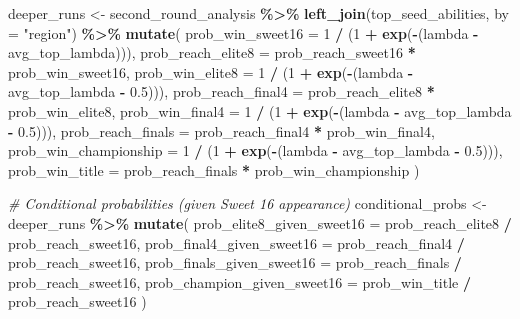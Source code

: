 \documentclass[
]{article}
\newenvironment{Shaded}{\begin{snugshade}}{\end{snugshade}}
\newcommand{\AttributeTok}[1]{\textcolor[rgb]{0.13,0.29,0.53}{#1}}
\newcommand{\CommentTok}[1]{\textcolor[rgb]{0.56,0.35,0.01}{\textit{#1}}}
\newcommand{\DecValTok}[1]{\textcolor[rgb]{0.00,0.00,0.81}{#1}}
\newcommand{\FloatTok}[1]{\textcolor[rgb]{0.00,0.00,0.81}{#1}}
\newcommand{\FunctionTok}[1]{\textcolor[rgb]{0.13,0.29,0.53}{\textbf{#1}}}
\newcommand{\NormalTok}[1]{#1}
\newcommand{\OtherTok}[1]{\textcolor[rgb]{0.56,0.35,0.01}{#1}}
\newcommand{\SpecialCharTok}[1]{\textcolor[rgb]{0.81,0.36,0.00}{\textbf{#1}}}
\newcommand{\StringTok}[1]{\textcolor[rgb]{0.31,0.60,0.02}{#1}}
\begin{document}
\begin{Shaded}
\begin{Highlighting}[]
\NormalTok{deeper\_runs }\OtherTok{\textless{}{-}}\NormalTok{ second\_round\_analysis }\SpecialCharTok{\%\textgreater{}\%}
    \FunctionTok{left\_join}\NormalTok{(top\_seed\_abilities, }\AttributeTok{by =} \StringTok{"region"}\NormalTok{) }\SpecialCharTok{\%\textgreater{}\%}
    \FunctionTok{mutate}\NormalTok{(}
        \AttributeTok{prob\_win\_sweet16 =} \DecValTok{1} \SpecialCharTok{/}\NormalTok{ (}\DecValTok{1} \SpecialCharTok{+} \FunctionTok{exp}\NormalTok{(}\SpecialCharTok{{-}}\NormalTok{(lambda }\SpecialCharTok{{-}}\NormalTok{ avg\_top\_lambda))),}
        \AttributeTok{prob\_reach\_elite8 =}\NormalTok{ prob\_reach\_sweet16 }\SpecialCharTok{*}\NormalTok{ prob\_win\_sweet16,}
        \AttributeTok{prob\_win\_elite8 =} \DecValTok{1} \SpecialCharTok{/}\NormalTok{ (}\DecValTok{1} \SpecialCharTok{+} \FunctionTok{exp}\NormalTok{(}\SpecialCharTok{{-}}\NormalTok{(lambda }\SpecialCharTok{{-}}\NormalTok{ avg\_top\_lambda }\SpecialCharTok{{-}} \FloatTok{0.5}\NormalTok{))),}
        \AttributeTok{prob\_reach\_final4 =}\NormalTok{ prob\_reach\_elite8 }\SpecialCharTok{*}\NormalTok{ prob\_win\_elite8,}
        \AttributeTok{prob\_win\_final4 =} \DecValTok{1} \SpecialCharTok{/}\NormalTok{ (}\DecValTok{1} \SpecialCharTok{+} \FunctionTok{exp}\NormalTok{(}\SpecialCharTok{{-}}\NormalTok{(lambda }\SpecialCharTok{{-}}\NormalTok{ avg\_top\_lambda }\SpecialCharTok{{-}} \FloatTok{0.5}\NormalTok{))),}
        \AttributeTok{prob\_reach\_finals =}\NormalTok{ prob\_reach\_final4 }\SpecialCharTok{*}\NormalTok{ prob\_win\_final4,}
        \AttributeTok{prob\_win\_championship =} \DecValTok{1} \SpecialCharTok{/}\NormalTok{ (}\DecValTok{1} \SpecialCharTok{+} \FunctionTok{exp}\NormalTok{(}\SpecialCharTok{{-}}\NormalTok{(lambda }\SpecialCharTok{{-}}\NormalTok{ avg\_top\_lambda }\SpecialCharTok{{-}} \FloatTok{0.5}\NormalTok{))),}
        \AttributeTok{prob\_win\_title =}\NormalTok{ prob\_reach\_finals }\SpecialCharTok{*}\NormalTok{ prob\_win\_championship}
\NormalTok{    )}

\CommentTok{\# Conditional probabilities (given Sweet 16 appearance)}
\NormalTok{conditional\_probs }\OtherTok{\textless{}{-}}\NormalTok{ deeper\_runs }\SpecialCharTok{\%\textgreater{}\%}
    \FunctionTok{mutate}\NormalTok{(}
        \AttributeTok{prob\_elite8\_given\_sweet16 =}\NormalTok{ prob\_reach\_elite8 }\SpecialCharTok{/}\NormalTok{ prob\_reach\_sweet16,}
        \AttributeTok{prob\_final4\_given\_sweet16 =}\NormalTok{ prob\_reach\_final4 }\SpecialCharTok{/}\NormalTok{ prob\_reach\_sweet16,}
        \AttributeTok{prob\_finals\_given\_sweet16 =}\NormalTok{ prob\_reach\_finals }\SpecialCharTok{/}\NormalTok{ prob\_reach\_sweet16,}
        \AttributeTok{prob\_champion\_given\_sweet16 =}\NormalTok{ prob\_win\_title }\SpecialCharTok{/}\NormalTok{ prob\_reach\_sweet16}
\NormalTok{    )}


\end{Highlighting}
\end{Shaded}
\end{document}
